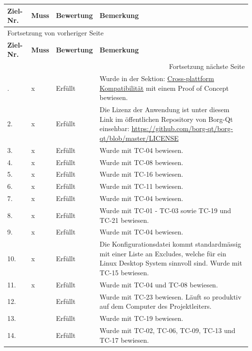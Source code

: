 \begin{longtable}{|p{1.5cm}|p{1cm}|p{2cm}|p{8.5cm}|}
\hline
\textbf{Ziel-Nr.}\cellcolor[HTML]{C0C0C0} & \textbf{Muss}\cellcolor[HTML]{C0C0C0} & \textbf{Bewertung}\cellcolor[HTML]{C0C0C0} & \textbf{Bemerkung}\cellcolor[HTML]{C0C0C0}\\
\hline
\endfirsthead
\multicolumn{4}{l}{Fortsetzung von vorheriger Seite} \\
\hline

\textbf{Ziel-Nr.}\cellcolor[HTML]{C0C0C0} & \textbf{Muss}\cellcolor[HTML]{C0C0C0} & \textbf{Bewertung}\cellcolor[HTML]{C0C0C0} & \textbf{Bemerkung}\cellcolor[HTML]{C0C0C0} \\

\hline
\endhead
\hline\multicolumn{4}{r}{Fortsetzung nächste Seite} \\
\endfoot
\endlastfoot
\hline
1. & x & Erfüllt & Wurde in der Sektion: \hyperref[sec:orgcad6880]{Cross-plattform Kompatibilität} mit einem Proof of Concept bewiesen.\\
\hline
2. & x & Erfüllt & Die Lizenz der Anwendung ist unter diesem Link im öffentlichen Repository von Borg-Qt einsehbar: \url{https://github.com/borg-qt/borg-qt/blob/master/LICENSE}\\
\hline
3. & x & Erfüllt & Wurde mit TC-04 bewiesen.\\
\hline
4. & x & Erfüllt & Wurde mit TC-08 bewiesen.\\
\hline
5. & x & Erfüllt & Wurde mit TC-16 bewiesen.\\
\hline
6. & x & Erfüllt & Wurde mit TC-11 bewiesen.\\
\hline
7. & x & Erfüllt & Wurde mit TC-04 bewiesen.\\
\hline
8. & x & Erfüllt & Wurde mit TC-01 - TC-03 sowie TC-19 und TC-21 bewiesen.\\
\hline
9. & x & Erfüllt & Wurde mit TC-04 bewiesen.\\
\hline
10. & x & Erfüllt & Die Konfigurationsdatei kommt standardmässig mit einer Liste an Excludes, welche für ein Linux Desktop System sinnvoll sind. Wurde mit TC-15 bewiesen.\\
\hline
11. & x & Erfüllt & Wurde mit TC-04 und TC-08 bewiesen.\\
\hline
12. &  & Erfüllt & Wurde mit TC-23 bewiesen. Läuft so produktiv auf dem Computer des Projektleiters.\\
\hline
13. &  & Erfüllt & Wurde mit TC-19 bewiesen.\\
\hline
14. &  & Erfüllt & Wurde mit TC-02, TC-06, TC-09, TC-13 und TC-17 bewiesen.\\

\end{longtable}
